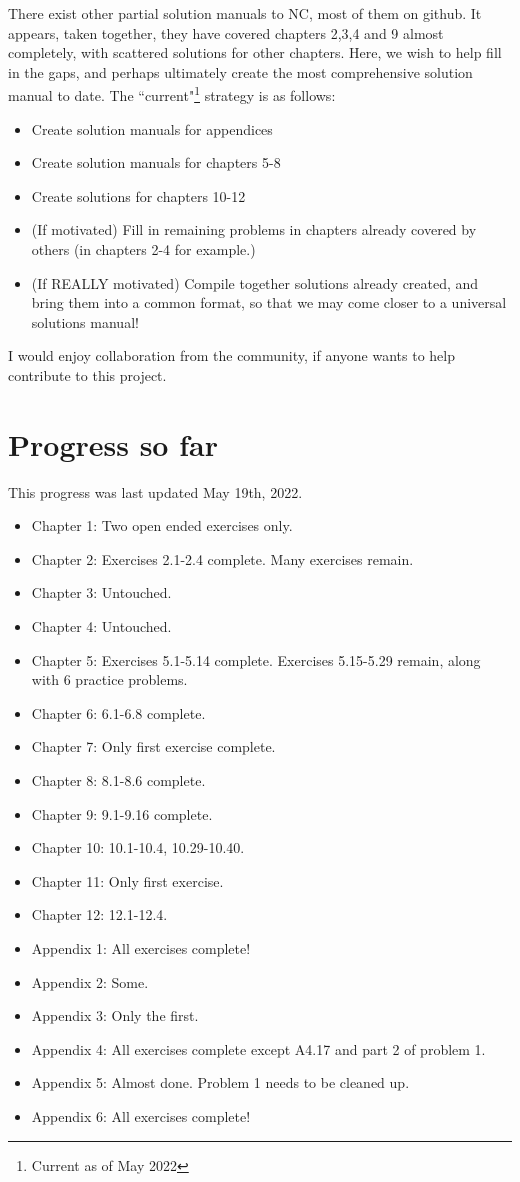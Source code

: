 \documentclass{book}
\begin{document}
There exist other partial solution manuals to NC, most of them on github. It appears, taken together, they have covered chapters 2,3,4 and 9 almost completely, with scattered solutions for other chapters. Here, we wish to help fill in the gaps, and perhaps ultimately create the most comprehensive solution manual to date. The ``current"\footnote{Current as of May 2022} strategy is as follows:
\begin{itemize}
    \item Create solution manuals for appendices
    \item Create solution manuals for chapters 5-8
    \item Create solutions for chapters 10-12
    \item (If motivated) Fill in remaining problems in chapters already covered by others (in chapters 2-4 for example.)
    \item (If REALLY motivated) Compile together solutions already created, and bring them into a common format, so that we may come closer to a universal solutions manual!
\end{itemize}
I would enjoy collaboration from the community, if anyone wants to help contribute to this project. 

\section{Progress so far}

This progress was last updated May 19th, 2022.

\begin{itemize}
    \item Chapter 1: Two open ended exercises only.
    \item Chapter 2: Exercises 2.1-2.4 complete. Many exercises remain.
    \item Chapter 3: Untouched.
    \item Chapter 4: Untouched.
    \item Chapter 5: Exercises 5.1-5.14 complete. Exercises 5.15-5.29 remain, along with 6 practice problems.
    \item Chapter 6: 6.1-6.8 complete.
    \item Chapter 7: Only first exercise complete.
    \item Chapter 8: 8.1-8.6 complete.
    \item Chapter 9: 9.1-9.16 complete.
    \item Chapter 10: 10.1-10.4, 10.29-10.40.
    \item Chapter 11: Only first exercise.
    \item Chapter 12: 12.1-12.4.
    \item Appendix 1: All exercises complete!
    \item Appendix 2: Some.
    \item Appendix 3: Only the first.
    \item Appendix 4: All exercises complete except A4.17 and part 2 of problem 1.
    \item Appendix 5: Almost done. Problem 1 needs to be cleaned up. 
    \item Appendix 6: All exercises complete!
\end{itemize}
\end{document}
